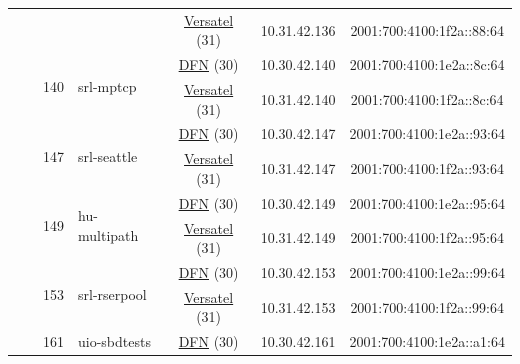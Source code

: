 \begin{small}
\begin{center}
\begin{longtable}{|c|c|c|c|c|c|c|c|}
  &  &  &  & \multicolumn{2}{|c|}{\tiny{\href{http://www.versatel.de}{Versatel} (31)}} & \tiny{10.31.42.136} & \tiny{2001:700:4100:1f2a::88:64} \\* \cline{3-3}\cline{4-4}\cline{5-5}\cline{6-6}\cline{7-7}\cline{8-8}
  &  & \multirow{2}{*}{\tiny{140}} & \multicolumn{1}{|l|}{\multirow{2}{*}{\tiny{srl-mptcp}}} & \multicolumn{2}{|c|}{\tiny{\href{https://www.dfn.de}{DFN} (30)}} & \tiny{10.30.42.140} & \tiny{2001:700:4100:1e2a::8c:64} \\* \cline{5-5}\cline{6-6}\cline{7-7}\cline{8-8}
  &  &  &  & \multicolumn{2}{|c|}{\tiny{\href{http://www.versatel.de}{Versatel} (31)}} & \tiny{10.31.42.140} & \tiny{2001:700:4100:1f2a::8c:64} \\* \cline{3-3}\cline{4-4}\cline{5-5}\cline{6-6}\cline{7-7}\cline{8-8}
  &  & \multirow{2}{*}{\tiny{147}} & \multicolumn{1}{|l|}{\multirow{2}{*}{\tiny{srl-seattle}}} & \multicolumn{2}{|c|}{\tiny{\href{https://www.dfn.de}{DFN} (30)}} & \tiny{10.30.42.147} & \tiny{2001:700:4100:1e2a::93:64} \\* \cline{5-5}\cline{6-6}\cline{7-7}\cline{8-8}
  &  &  &  & \multicolumn{2}{|c|}{\tiny{\href{http://www.versatel.de}{Versatel} (31)}} & \tiny{10.31.42.147} & \tiny{2001:700:4100:1f2a::93:64} \\* \cline{3-3}\cline{4-4}\cline{5-5}\cline{6-6}\cline{7-7}\cline{8-8}
  &  & \multirow{2}{*}{\tiny{149}} & \multicolumn{1}{|l|}{\multirow{2}{*}{\tiny{hu-multipath}}} & \multicolumn{2}{|c|}{\tiny{\href{https://www.dfn.de}{DFN} (30)}} & \tiny{10.30.42.149} & \tiny{2001:700:4100:1e2a::95:64} \\* \cline{5-5}\cline{6-6}\cline{7-7}\cline{8-8}
  &  &  &  & \multicolumn{2}{|c|}{\tiny{\href{http://www.versatel.de}{Versatel} (31)}} & \tiny{10.31.42.149} & \tiny{2001:700:4100:1f2a::95:64} \\* \cline{3-3}\cline{4-4}\cline{5-5}\cline{6-6}\cline{7-7}\cline{8-8}
  &  & \multirow{2}{*}{\tiny{153}} & \multicolumn{1}{|l|}{\multirow{2}{*}{\tiny{srl-rserpool}}} & \multicolumn{2}{|c|}{\tiny{\href{https://www.dfn.de}{DFN} (30)}} & \tiny{10.30.42.153} & \tiny{2001:700:4100:1e2a::99:64} \\* \cline{5-5}\cline{6-6}\cline{7-7}\cline{8-8}
  &  &  &  & \multicolumn{2}{|c|}{\tiny{\href{http://www.versatel.de}{Versatel} (31)}} & \tiny{10.31.42.153} & \tiny{2001:700:4100:1f2a::99:64} \\* \cline{3-3}\cline{4-4}\cline{5-5}\cline{6-6}\cline{7-7}\cline{8-8}
  &  & \multirow{2}{*}{\tiny{161}} & \multicolumn{1}{|l|}{\multirow{2}{*}{\tiny{uio-sbdtests}}} & \multicolumn{2}{|c|}{\tiny{\href{https://www.dfn.de}{DFN} (30)}} & \tiny{10.30.42.161} & \tiny{2001:700:4100:1e2a::a1:64} \\* \cline{5-5}\cline{6-6}\cline{7-7}\cline{8-8}

\end{longtable}
\end{center}
\end{small}
